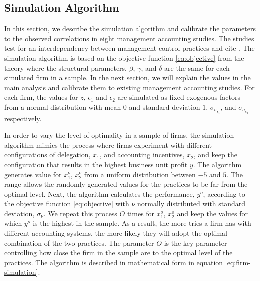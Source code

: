 \documentclass[12pt]{article}
\begin{document}
\subsection{Simulation Algorithm}

In this section, we describe the simulation algorithm and calibrate the parameters to the observed correlations in eight management accounting studies. The studies test for an interdependency between management control practices and cite \citet{grabner_management_2013}. The simulation algorithm is based on the objective function \eqref{eq:objective} from the theory where the structural parameters, $\beta$, $\gamma$, and $\delta$ are the same for each simulated firm in a sample. In the next section, we will explain the values in the main analysis and calibrate them to existing management accounting studies. For each firm, the values for $z$, $\epsilon_1$ and $\epsilon_2$ are simulated as fixed exogenous factors from a normal distribution with mean $0$ and standard deviation $1$,  $\sigma_{\sigma_{\epsilon_1}}$, and $\sigma_{\sigma_{\epsilon_2}}$ respectively. 

In order to vary the level of optimality in a sample of firms, the simulation algorithm mimics the process where firms experiment with different configurations of delegation, $x_1$,  and accounting incentives, $x_2$, and keep the configuration that results in the highest business unit profit $y$. The algorithm generates value for $x^o_{1}$, $x^o_{2}$ from a uniform distribution between $-5$ and $5$. The range allows the randomly generated values for the practices to be far from the optimal level. Next, the algorithm calculates the performance, $y^o$, according to the objective function \eqref{eq:objective} with $\nu$ normally distributed with standard deviation, $\sigma_{\nu}$. We repeat this process $O$ times for $x^o_{1}$, $x^o_{2}$ and keep the values for which $y^o$ is the highest in the sample. As a result, the more tries a firm has with different accounting systems, the more likely they will adopt the optimal combination of the two practices. The parameter $O$ is the key parameter controlling how close the firm in the sample are to the optimal level of the practices. The algorithm is described in mathematical form in equation \eqref{eq:firm-simulation}. 
\end{document}
